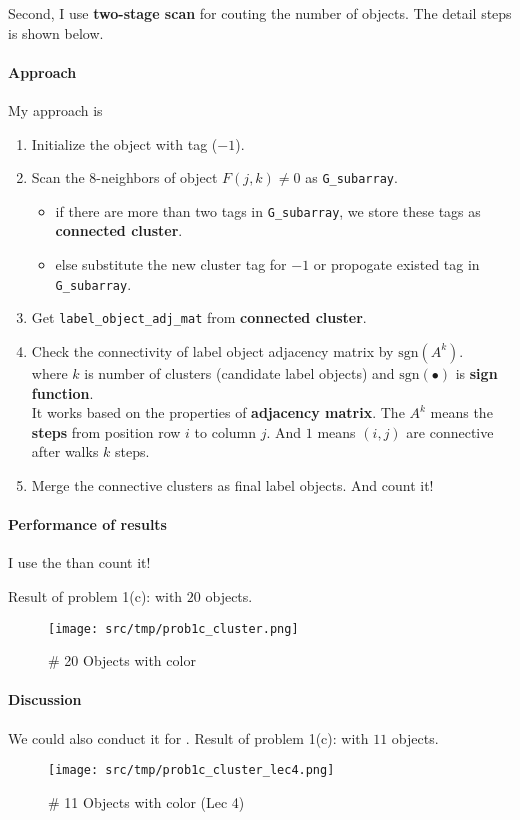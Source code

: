 Second, I use \textbf{two-stage scan} for couting the number of objects. The detail steps is shown below.

\paragraph{Approach}
My approach is
\begin{enumerate}
    \item Initialize the object with tag (\(-1\)).
    \item Scan the \(8\)-neighbors of object \(F(j, k) \neq 0\) as \texttt{G\_subarray}.
	\begin{itemize}
	    \item if there are more than two tags in \texttt{G\_subarray}, we store these tags as \textbf{connected cluster}.
	    \item else substitute the new cluster tag for \(-1\) or propogate existed tag in \texttt{G\_subarray}.
	\end{itemize}
    \item Get \texttt{label\_object\_adj\_mat} from \textbf{connected cluster}.
    \item Check the connectivity of label object adjacency matrix by \(\mbox{sgn}(A^{k})\). \\
	where \(k\) is number of clusters (candidate label objects) and \(\mbox{sgn}(\bullet)\) is \textbf{sign function}. \\
	It works based on the properties of \textbf{adjacency matrix}. The \(A^{k}\) means the \textbf{steps} from position row \(i\) to column \(j\). And \(1\) means \((i, j)\) are connective after walks \(k\) steps.
    \item Merge the connective clusters as final label objects. And count it!
\end{enumerate}

\paragraph{Performance of results}
I use the  than count it!

Result of problem 1(c):  with \(20\) objects.
\begin{figure}
    \centering
    \texttt{[image: src/tmp/prob1c\_cluster.png]}
    \caption{\# 20 Objects with color}
    \label{prob1c_cluster}
\end{figure}

\paragraph{Discussion}
We could also conduct it for .
Result of problem 1(c):  with \(11\) objects.
\begin{figure}
    \centering
    \texttt{[image: src/tmp/prob1c\_cluster\_lec4.png]}
    \caption{\# 11 Objects with color (Lec 4)}
    \label{prob1c_cluster_lec4}
\end{figure}

